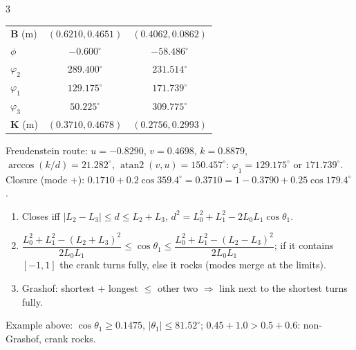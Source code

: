 \begin{multicols}{3}
\begin{worked}
\begin{tabularx}{\linewidth}{@{}Xcc@{}}
$\mathbf B$ (m) & $(0.6210,0.4651)$ & $(0.4062,0.0862)$\\
$\phi$ & $-0.600^\circ$ & $-58.486^\circ$\\
$\varphi_2$ & $289.400^\circ$ & $231.514^\circ$\\
$\varphi_1$ & $129.175^\circ$ & $171.739^\circ$\\
$\varphi_3$ & $50.225^\circ$ & $309.775^\circ$\\
$\mathbf K$ (m) & $(0.3710,0.4678)$ & $(0.2756,0.2993)$\\\bottomrule
\end{tabularx}
Freudenstein route: $u=-0.8290$, $v=0.4698$, $k=0.8879$, $\arccos(k/d)=21.282^\circ$, $\operatorname{atan2}(v,u)=150.457^\circ$: $\varphi_1=129.175^\circ$ or $171.739^\circ$. Closure (mode $+$): $0.1710+0.2\cos359.4^\circ=0.3710=1-0.3790+0.25\cos179.4^\circ$ \checkmark.
\end{worked}
\begin{recipe}
\begin{enumerate}
\item Closes iff $\lvert L_2-L_3\rvert\le d\le L_2+L_3$, $d^2=L_0^2+L_1^2-2L_0L_1\cos\theta_1$.
\item $\dfrac{L_0^2+L_1^2-(L_2+L_3)^2}{2L_0L_1}\le\cos\theta_1\le\dfrac{L_0^2+L_1^2-(L_2-L_3)^2}{2L_0L_1}$; if it contains $[-1,1]$ the crank turns fully, else it rocks (modes merge at the limits).
\item Grashof: shortest + longest $\le$ other two $\Rightarrow$ link next to the shortest turns fully.
\end{enumerate}
\end{recipe}
Example above: $\cos\theta_1\ge0.1475$, $\lvert\theta_1\rvert\le81.52^\circ$; $0.45+1.0>0.5+0.6$: non-Grashof, crank rocks. \chk


\end{multicols}
